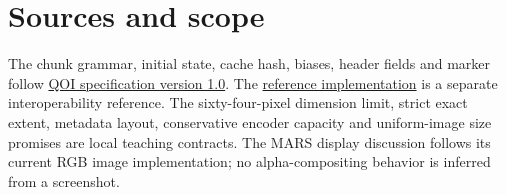 \section{Sources and scope}
The chunk grammar, initial state, cache hash, biases, header fields and marker follow
\href{https://qoiformat.org/qoi-specification.pdf}{QOI specification version 1.0}.
The \href{https://github.com/phoboslab/qoi}{reference implementation} is a separate
interoperability reference. The sixty-four-pixel dimension limit, strict exact extent,
metadata layout, conservative encoder capacity and uniform-image size promises are
local teaching contracts. The MARS display discussion follows its current RGB image
implementation; no alpha-compositing behavior is inferred from a screenshot.
